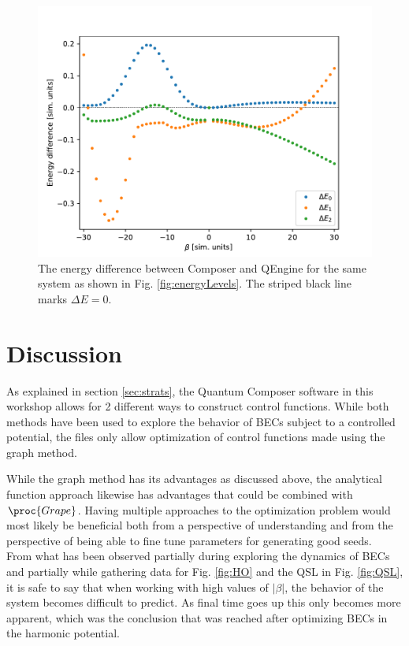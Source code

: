 \documentclass[a4paper, twocolumn]{revtex4-1}
\begin{document}
\begin{figure}
	\includegraphics[width=\columnwidth]{graphics/stateAnalysis/energyDiffQEngineComp.pdf}
	\caption{The energy difference between Composer and QEngine for the same system as shown in Fig. \ref{fig:energyLevels}. The striped black line marks $\Delta E=0$.}
	\label{fig:QEngine_energydiff}
\end{figure}

\section{\label{sec:disc}Discussion}
As explained in section \ref{sec:strats}, the Quantum Composer software in this workshop allows for 2 different ways to construct control functions. While both methods have been used to explore the behavior of BECs subject to a controlled potential, the files only allow optimization of control functions made using the graph method.

While the graph method has its advantages as discussed above, the analytical function approach likewise has advantages that could be combined with $\proc{Grape}$. Having multiple approaches to the optimization problem would most likely be beneficial both from a perspective of understanding and from the perspective of being able to fine tune parameters for generating good seeds.\\

From what has been observed partially during exploring the dynamics of BECs and partially while gathering data for Fig. \ref{fig:HO} and the QSL in Fig. \ref{fig:QSL}, it is safe to say that when working with high values of $|\beta|$, the behavior of the system becomes difficult to predict. As final time goes up this only becomes more apparent, which was the conclusion that was reached after optimizing BECs in the harmonic potential.
\end{document}
